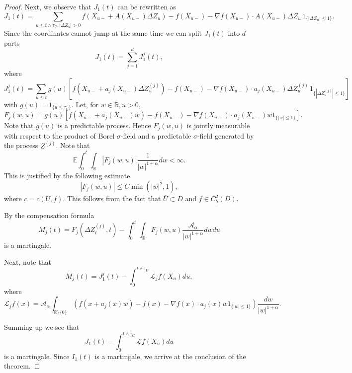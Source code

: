 \documentclass[a4paper,12pt,reqno]{amsart}
\theoremstyle{definition}
\theoremstyle{remark}
\newcommand{\Aa}{\mathcal{A}_{\alpha}}
\newcommand{\calL}{\mathcal{L}}
\newcommand{\Ee}{\mathds{E}} %
\newcommand{\R}{\mathds{R}}
\begin{document}
\begin{proof}
Next, we observe that $J_1(t)$ can be rewritten as 
$$J_1(t)=\sum_{u\le t\wedge \tau_{U}, |\Delta Z_u|>0 }f(X_{u-}+ A(X_{u-}) \Delta Z_u  )-f(X_{{u-}})-\nabla f(X_{u-})\cdot A(X_{u-}) \Delta Z_u \, 1_{\{|\Delta Z_u|\le 1\}}. $$
Since the coordinates cannot jump at the same time we can split $J_1(t)$ into $d$ parts
%
$$J_1(t)=\sum_{j=1}^d J^{j}_1(t),$$
%
where 
%
$$J^{j}_1(t)= \sum_{u\le t }g(u)\left[f(X_{u-}+ a_j(X_{u-}) \Delta Z^{(j)}_u  )-f(X_{{u-}})-\nabla f(X_{u-})\cdot a_j(X_{u-}) \Delta Z^{(j)}_u \, 1_{\{|\Delta Z^{(j)}_u|\le 1\}}\right] $$
with  $g(u)= 1_{\{u\le  \tau_{U}\}}$. 
Let, for $w\in \R, u>0$,
$$F_j(w,u)= g(u)\left[f(X_{u-}+ a_j(X_{u-})w  )-f(X_{{u-}})-\nabla f(X_{u-})\cdot a_j(X_{u-}) w 1_{\{|w|\le 1\}}\right].$$
Note that $g(u)$ is  a predictable process. Hence $F_j(w,u)$
 is  jointly measurable with respect to the product of Borel $\sigma$-field and a predictable 
$\sigma$-field generated by the process $Z^{(j)}$.  Note that 
%
$$\Ee\int_0^t \int_{\R}|F_j(w,u)|\frac 1{|w|^{1+\alpha}}dw<\infty.$$ This is justified by the following estimate
$$|F_j(w,u)|\le  C \min(|w|^2,1),$$
%
where $c=c(U,f)$. This follows from the fact that $\bar{U}\subset D$ and $f \in C_b^2(D)$.

By the compensation formula
$$M_j(t)= F_j(\Delta Z^{(j)}_t,t)- \int_0^t \int_{\R}F_j(w,u)\frac{\Aa }{|w|^{1+\alpha}}dw du$$
is a martingale.

Next, note that $$M_j(t)= J^{j}_1(t)- \int_0^{t\wedge \tau_{U}}\calL_j  f(X_{{u}})du,$$
where
$$\calL_j  f(x)= \Aa \int_{\R \setminus \{0\}} \left( f(x+a_j(x)w)-f(x)-\nabla f(x)\cdot a_j(x)w  
 1_{\{|w|\le1\}}\right)\frac{ dw}{|w|^{1+\alpha}}.$$ 

Summing up we see that $$J_1(t)-\int_0^{t\wedge \tau_{U}}\calL  f(X_{{u}}) du$$ is a martingale.
Since $I_1(t)$ is a martingale, we arrive at the conclusion of the theorem.
\end{proof}
\end{document}
